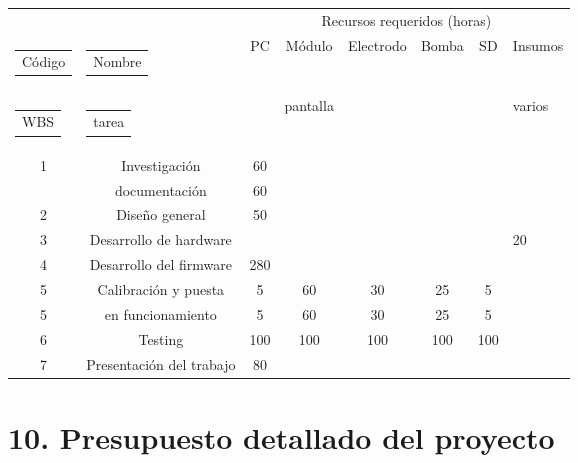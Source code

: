 \documentclass[11pt]{charter}
\begin{document}
\begin{table}[htpb]
\label{tab:recursos}

\begin{tabularx}{\linewidth}{@{}|c|c|c|c|c|c|c|X|@{}}
\hline
\cellcolor[HTML]{C0C0C0} & \cellcolor[HTML]{C0C0C0} & \multicolumn{6}{c|}{\cellcolor[HTML]{C0C0C0}Recursos requeridos (horas)} \\ \cline{3-8} 
\multirow{-2}{*}{\cellcolor[HTML]{C0C0C0}\begin{tabular}[c]{@{}c@{}}Código\end{tabular}} & \multirow{-2}{*}{\cellcolor[HTML]{C0C0C0}\begin{tabular}[c]{@{}c@{}}Nombre\end{tabular}} 
& PC & Módulo  & Electrodo  & Bomba    & SD   & Insumos\\
\multirow{-2}{*}{\cellcolor[HTML]{C0C0C0}\begin{tabular}[c]{@{}c@{}} WBS\end{tabular}} & \multirow{-2}{*}{\cellcolor[HTML]{C0C0C0}\begin{tabular}[c]{@{}c@{}}  tarea\end{tabular}} &  & pantalla  &  &     &  & varios\\ \hline
1& Investigación  &60  &  &  &&  &\\
& documentación   &60  &  &  &&  &\\ \hline
2& Diseño general  &50  &  &  &&  &\\ \hline
3& Desarrollo de hardware &  &  &  & & &20\\ \hline
4& Desarrollo del firmware   &280  &  &  & & &\\ \hline
5& Calibración y puesta &5  &60  &30  &25 &5 &\\ 
5& en funcionamiento  &5  &60  &30  &25 &5 &\\ \hline
6& Testing 	 &100  &100  &100  &100 &100 &\\ \hline
7&Presentación del trabajo   &80  &  &  & & &\\ \hline
\end{tabularx}%
\end{table}


\section{10. Presupuesto detallado del proyecto}
\label{sec:presupuesto}
\end{document}
